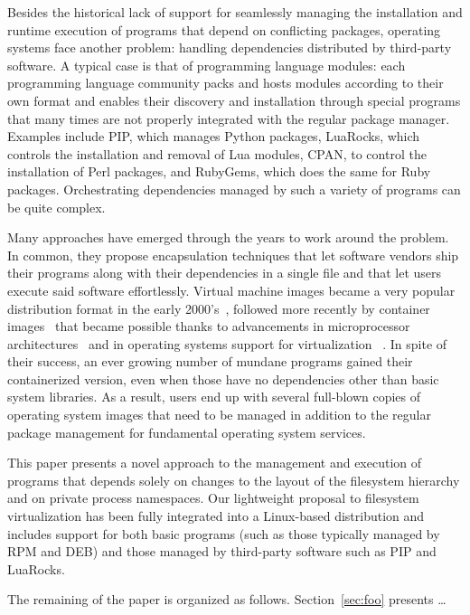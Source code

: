 \documentclass[sigplan, anonymous, 10pt]{acmart}
\begin{document}
Besides the historical lack of support for seamlessly managing the installation and runtime
execution of programs that depend on conflicting packages, operating systems face another problem:
handling dependencies distributed by third-party software. A typical case is that of programming
language modules: each programming language community packs and hosts modules according to their own
format and enables their discovery and installation through special programs that many times are not
properly integrated with the regular package manager. Examples include PIP, which manages Python
packages, LuaRocks, which controls the installation and removal of Lua modules, CPAN, to control the
installation of Perl packages, and RubyGems, which does the same for Ruby packages. Orchestrating
dependencies managed by such a variety of programs can be quite complex.

Many approaches have emerged through the years to work around the problem. In common, they propose
encapsulation techniques that let software vendors ship their programs along with their dependencies
in a single file and that let users execute said software effortlessly. Virtual machine images
became a very popular distribution format in the early 2000's~\cite{Who?}, followed more recently by
container images~\cite{fink2014:docker} that became possible thanks to advancements in microprocessor
architectures~\cite{uhlig2005:vtx, amd2005:svm} and in operating systems support for virtualization
~\cite{russell2008:virtio, dall2014:kvm+arm, kivity2007:kvm}. In spite
of their success, an ever growing number of mundane programs gained their containerized version,
even when those have no dependencies other than basic system libraries. As a result, users end up
with several full-blown copies of operating system images that need to be managed in addition to
the regular package management for fundamental operating system services.

This paper presents a novel approach to the management and execution of programs that depends
solely on changes to the layout of the filesystem hierarchy and on private process namespaces.
Our lightweight proposal to filesystem virtualization has been fully integrated into a Linux-based
distribution and includes support for both basic programs (such as those typically managed by RPM
and DEB) and those managed by third-party software such as PIP and LuaRocks.

The remaining of the paper is organized as follows. Section~\ref{sec:foo} presents \ldots
\end{document}

